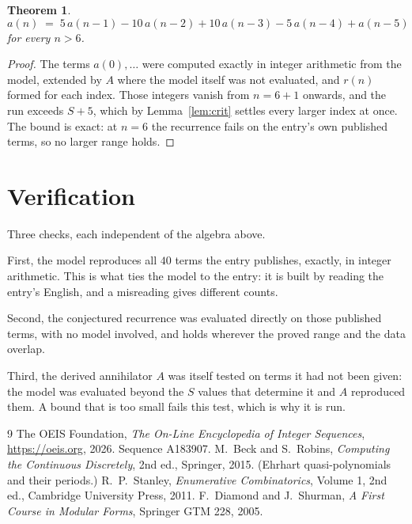 \documentclass[11pt,a4paper]{article}
\theoremstyle{plain}
\newtheorem{theorem}{Theorem}
\theoremstyle{definition}
\begin{document}
\begin{theorem}
\[
a(n)\;=\;5\,a(n-1) - 10\,a(n-2) + 10\,a(n-3) - 5\,a(n-4) + a(n-5)
\]
for every $n>6$.
\end{theorem}

\begin{proof}
The terms $a(0),\dots$ were computed exactly in integer arithmetic from the model, extended by
$A$ where the model itself was not evaluated, and $r(n)$ formed for each index. Those integers
vanish from $n=6+1$ onwards, and the run exceeds $S+5$, which by
Lemma~\ref{lem:crit} settles every larger index at once. The bound is exact: at $n=6$ the recurrence fails on the entry's own published terms, so no larger range holds.
\end{proof}

\section{Verification}

Three checks, each independent of the algebra above.

First, the model reproduces all $40$ terms the entry publishes, exactly, in integer
arithmetic. This is what ties the model to the entry: it is built by reading the entry's
English, and a misreading gives different counts.

Second, the conjectured recurrence was evaluated directly on those published terms, with no
model involved, and holds wherever the proved range and the data overlap.

Third, the derived annihilator $A$ was itself tested on terms it had not been given: the model
was evaluated beyond the $S$ values that determine it and $A$ reproduced them. A bound that is
too small fails this test, which is why it is run.

\begin{thebibliography}{9}
 The OEIS Foundation, \emph{The On-Line Encyclopedia of Integer
Sequences}, \url{https://oeis.org}, 2026. Sequence A183907.
 M.~Beck and S.~Robins, \emph{Computing the Continuous Discretely},
2nd ed., Springer, 2015. (Ehrhart quasi-polynomials and their periods.)
 R.~P.~Stanley, \emph{Enumerative Combinatorics}, Volume 1, 2nd ed.,
Cambridge University Press, 2011.
 F.~Diamond and J.~Shurman, \emph{A First Course in Modular Forms},
Springer GTM 228, 2005.
\end{thebibliography}
\end{document}
